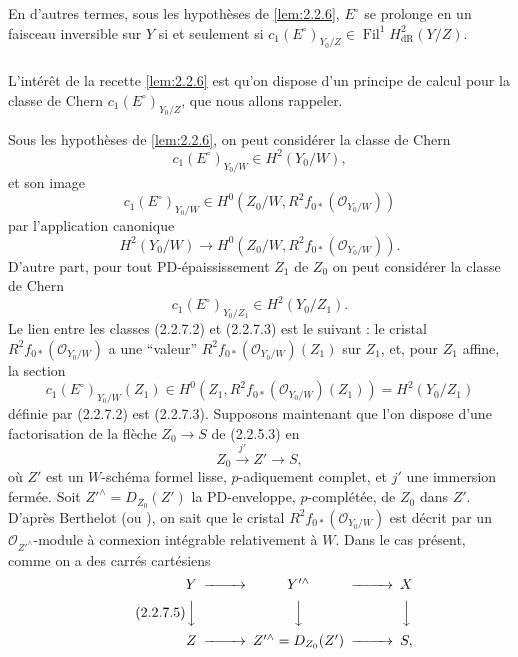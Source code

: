 \documentclass[12pt,a4paper]{article}
\theoremstyle{plain}
\theoremstyle{definition}
\theoremstyle{remark}
\DeclareMathOperator{\Fil}{Fil}
\begin{document}
En d'autres termes, sous les hypoth\`eses de \ref{lem:2.2.6}, $E^\circ$ se prolonge en un faisceau inversible sur $Y$ si et seulement si $c_1(E^\circ)_{Y_0/Z} \in \Fil^1 H^2_\mathrm{dR}(Y/Z)$.

\subsubsection{}
L'int\'er\^et de la recette \ref{lem:2.2.6} est qu'on dispose d'un principe de calcul pour la classe de Chern $c_1(E^\circ)_{Y_0/Z}$, que nous allons rappeler.

Sous les hypoth\`eses de \ref{lem:2.2.6}, on peut consid\'erer la classe de Chern
\begin{equation}\tag{2.2.7.1}
c_1(E^\circ)_{Y_0/W} \in H^2(Y_0/W), 
\end{equation}
et son image
\begin{equation}\tag{2.2.7.2}
c_1(E^\circ)_{Y_0/W} \in H^0(Z_0/W, R^2f_{0*}(\mathcal{O}_{Y_0/W})) 
\end{equation}
par l'application canonique
\[
H^2(Y_0/W) \longrightarrow H^0(Z_0/W, R^2f_{0*}(\mathcal{O}_{Y_0/W})).
\]
D'autre part, pour tout PD-\'epaississement $Z_1$ de $Z_0$ on peut consid\'erer la classe de Chern
\begin{equation}\tag{2.2.7.3}
c_1(E^\circ)_{Y_0/Z_1} \in H^2(Y_0/Z_1). 
\end{equation}
Le lien entre les classes (2.2.7.2) et (2.2.7.3) est le suivant : le cristal $R^2f_{0*}(\mathcal{O}_{Y_0/W})$ a une ``valeur'' $R^2f_{0*}(\mathcal{O}_{Y_0/W})(Z_1)$ sur $Z_1$, et, pour $Z_1$ affine, la section
\[
c_1(E^\circ)_{Y_0/W}(Z_1) \in H^0(Z_1, R^2f_{0*}(\mathcal{O}_{Y_0/W})(Z_1)) = H^2(Y_0/Z_1)
\]
d\'efinie par (2.2.7.2) est (2.2.7.3). Supposons maintenant que l'on dispose d'une factorisation de la fl\`eche $Z_0 \to S$ de (2.2.5.3) en
\begin{equation}\tag{2.2.7.4}
Z_0 \xrightarrow{j'} Z' \longrightarrow S, 
\end{equation}
o\`u $Z'$ est un $W$-sch\'ema formel lisse, $p$-adiquement complet, et $j'$ une immersion ferm\'ee. Soit $Z'^\wedge = D_{Z_0}(Z')$ la PD-enveloppe, $p$-compl\'et\'ee, de $Z_0$ dans $Z'$. D'apr\`es Berthelot \cite{Berthelot} (ou \cite[\S 7]{BerthelotOgus}), on sait que le cristal $R^2f_{0*}(\mathcal{O}_{Y_0/W})$ est d\'ecrit par un $\mathcal{O}_{Z'^\wedge}$-module \`a connexion int\'egrable relativement \`a $W$. Dans le cas pr\'esent, comme on a des carr\'es cart\'esiens
\begin{equation}\tag{2.2.7.5}
\begin{CD}
Y @>>> Y'^\wedge @>>> X \\
@VVV @VVV @VVV \\
Z @>>> Z'^\wedge = D_{Z_0}(Z') @>>> S,
\end{CD} 
\end{equation}
\end{document}
